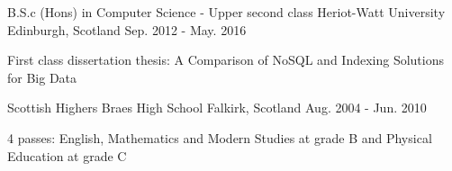 \begin{cventries}
  \cventry
    {B.S.c (Hons) in Computer Science - Upper second class}
    {Heriot-Watt University}
    {Edinburgh, Scotland}
    {Sep. 2012 - May. 2016}
    {
      \begin{cvitems}
        \item {First class dissertation thesis: A Comparison of NoSQL and Indexing Solutions for Big Data}
      \end{cvitems}
    }
    \cventry
    {Scottish Highers}
    {Braes High School}
    {Falkirk, Scotland}
    {Aug. 2004 - Jun. 2010}
    {
      \begin{cvitems}
        \item {4 passes: English, Mathematics and Modern Studies at grade B and Physical Education at grade C}
      \end{cvitems}
    }
\end{cventries}